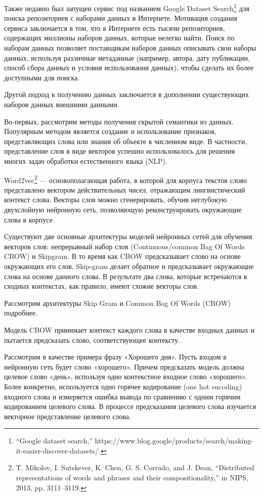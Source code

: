 \documentclass[12pt,a4paper, oneside]{extreport}
\begin{document}
Также недавно был запущен сервис под названием Google Dataset Search\footnote{“Google dataset search,” https://www.blog.google/products/search/making-it-easier-discover-datasets/.}  для поиска репозиториев с наборами  данных в Интернете. Мотивация создания сервиса заключается в том, что в Интернете есть тысячи репозиториев, содержащих миллионы наборов данных, которые нелегко найти. Поиск по наборам данных позволяет поставщикам наборов данных описывать свои наборы данных, используя различные метаданные (например, автора, дату публикации, способ сбора данных и условия использования данных), чтобы сделать их более доступными для поиска. 


Другой подход к получению данных заключается в дополнении существующих наборов данных внешними данными. 

Во-первых, рассмотрим методы получения скрытой семантики из данных. Популярным методом является создание и использование признаков, представляющих слова или знания об объекте в численном виде. 
В частности, представление  слов в виде векторов  успешно использовалось для решения многих задач обработки естественного языка (NLP). 

Word2vec\footnote{T. Mikolov, I. Sutskever, K. Chen, G. S. Corrado, and J. Dean, 	“Distributed representations of words and phrases and their 	compositionality,” in NIPS, 2013, pp. 3111–3119.} — основополагающая работа, в которой для корпуса текстов слово представлено вектором действительных чисел, отражающим лингвистический контекст слова. Векторы слов можно сгенерировать, обучив неглубокую двухслойную нейронную сеть, позволяющую реконструировать окружающие слова в корпусе. 




Существуют две основные архитектуры моделей нейронных сетей для обучения векторов слов: непрерывный набор слов (Continuous/common Bag Of Words CBOW) и Skipgram. 
В то время как CBOW предсказывает слово на основе окружающих его слов, Skip-gram делает обратное и предсказывает окружающие слова на основе данного слова. В результате два слова, которые встречаются в сходных контекстах, как правило, имеют схожие векторы слов.

Рассмотрим архитектуры Skip Gram и Common Bag Of Words (CBOW) подробнее.

Модель CBOW принимает контекст каждого слова в качестве входных данных и пытается предсказать слово, соответствующее контексту. 

Рассмотрим в качестве примера фразу «Хорошего дня».
Пусть входом в нейронную сеть будет слово «хорошего». Причем предсказать модель должна целевое слово «день», используя одно контекстное входное слово «хорошего». Более конкретно,  используется одно горячее кодирование (one hot encoding) входного слова и измеряется  ошибка вывода по сравнению с одним горячим кодированием целевого слова. В процессе предсказания целевого слова изучается векторное представление целевого слова.
\end{document}
